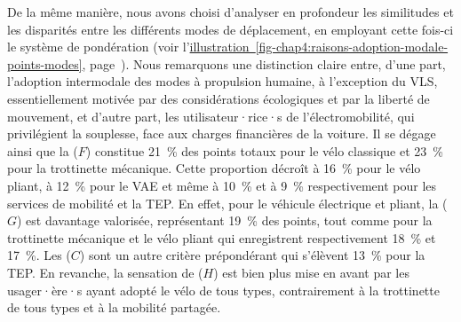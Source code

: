 \begin{refsegment}
De la même manière, nous avons choisi d'analyser en profondeur les similitudes et les disparités entre les différents modes de déplacement, en employant cette fois-ci le système de pondération (voir l'\hyperref[fig-chap4:raisons-adoption-modale-points-modes]{illustration~\ref{fig-chap4:raisons-adoption-modale-points-modes}}, page~\pageref{fig-chap4:raisons-adoption-modale-points-modes}). Nous remarquons une distinction claire entre, d'une part, l'adoption intermodale des modes à propulsion humaine, à l'exception du \acrshort{VLS}, essentiellement motivée par des considérations écologiques et par la liberté de mouvement, et d'autre part, les utilisateur·rice·s de l'électromobilité, qui privilégient la souplesse, face aux charges financières de la voiture. Il se dégage ainsi que la  (\(F\)) constitue 21~\% des points totaux pour le vélo classique et 23~\% pour la trottinette mécanique. Cette proportion décroît à 16~\% pour le vélo pliant, à 12~\% pour le \acrshort{VAE} et même à 10~\% et à 9~\% respectivement pour les services de mobilité et la \acrshort{TEP}. En effet, pour le véhicule électrique et pliant, la  (\(G\)) est davantage valorisée, représentant 19~\% des points, tout comme pour la trottinette mécanique et le vélo pliant qui enregistrent respectivement 18~\% et 17~\%. Les  (\(C\)) sont un autre critère prépondérant qui s'élèvent 13~\% pour la \acrshort{TEP}. En revanche, la sensation de  (\(H\)) est bien plus mise en avant par les usager·ère·s ayant adopté le vélo de tous types, contrairement à la trottinette de tous types et à la mobilité partagée.%


\end{refsegment}
